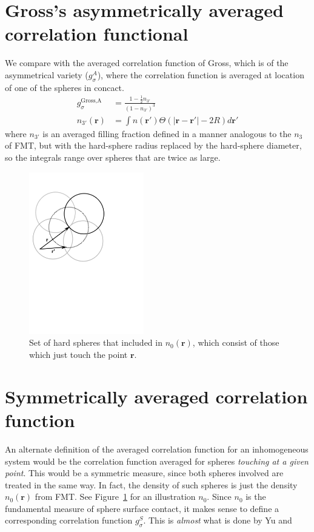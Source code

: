 \documentclass[letterpaper,twocolumn,amsmath,amssymb,jcp,10pt,aip]{revtex4-1}
\newcommand{\rr}{\textbf{r}}
\newcommand{\derivation}[1]{} %
\begin{document}
\derivation{
  \end{widetext}
}

\section{Gross's asymmetrically averaged correlation functional}\label{sec:gross}
We compare with the averaged correlation function of
Gross\cite{gross2009density}, which is of the asymmetrical variety
($g_\sigma^A$), where the correlation function is averaged at location
of one of the spheres in concact.
\begin{align}
  g_\sigma^\text{Gross,A} &= \frac{1 - \frac12 n_{3'}}{\left(1 -
    n_{3'}\right)^3} \\
  n_{3'}(\rr) &= \int n(\rr')\Theta(|\rr-\rr'| - 2R) d\rr'
\end{align}
where $n_{3'}$ is an averaged
filling fraction defined in a manner analogous to the $n_3$ of FMT,
but with the hard-sphere radius replaced by the hard-sphere diameter,
so the integrals range over spheres that are twice as large.

\begin{figure}
\includegraphics[width=5cm]{figs/n0}
\caption{Set of hard spheres that included in $n_0(\mathbf{r})$, which
  consist of those which just touch the point $\mathbf{r}$.}
\label{fig:n0}
\end{figure}

\section{Symmetrically averaged correlation function}\label{sec:g-S}

An alternate definition of the averaged correlation function for an
inhomogeneous system would be the correlation function averaged for
spheres \emph{touching at a given point}.  This would be a symmetric
measure, since both spheres involved are treated in the same way.  In
fact, the density of such spheres is just the density $n_0(\rr)$ from
FMT.  See Figure~\ref{fig:n0} for an illustration $n_0$.  Since $n_0$
is the fundamental measure of sphere surface contact, it makes sense
to define a corresponding correlation function $g_\sigma^S$.  This is
\emph{almost} what is done by Yu and
\end{document}
